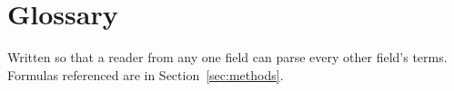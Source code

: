 \documentclass[11pt]{article}
\theoremstyle{remark}
\begin{document}


\section{Glossary}\label{app:glossary}

Written so that a reader from any one field can parse every other
field's terms. Formulas referenced are in Section~\ref{sec:methods}.
\end{document}
